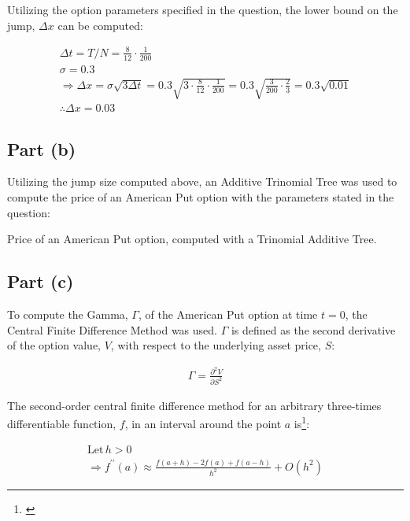 \documentclass[10pt]{article}
\begin{document}
Utilizing the option parameters specified in the question, the lower bound on the jump, $\Delta x$ can be computed:

\begin{gather*}
    \Delta t = T / N = \frac{8}{12} \cdot \frac{1}{200} \\
    \sigma = 0.3 \\
    \Rightarrow \Delta x
        = \sigma \sqrt{3 \Delta t}
        = 0.3 \sqrt{3 \cdot \frac{8}{12} \cdot \frac{1}{200}}
        = 0.3 \sqrt{\frac{3}{200} \cdot \frac{2}{3}}
        = 0.3 \sqrt{0.01} \\
    \therefore \Delta x = 0.03
\end{gather*}


\subsection{Part (b)}

Utilizing the jump size computed above, an Additive Trinomial Tree was used to compute the price of an American Put option with the parameters stated in the question:

\begin{table}[!h]
    \centering
    \caption{Price of an American Put option, computed with a Trinomial Additive Tree.}
    \label{table:q2_american_put_price}
\end{table}

\newpage
\subsection{Part (c)}

To compute the Gamma, $\Gamma$, of the American Put option at time $t = 0$, the Central Finite Difference Method was used. $\Gamma$ is defined as the second derivative of the option value, $V$, with respect to the underlying asset price, $S$:

\begin{gather*}
    \Gamma = \frac{\partial^2 V}{\partial S^2}
\end{gather*}

The second-order central finite difference method for an arbitrary three-times differentiable function, $f$, in an interval around the point $a$ is\footnote{\cite{Stefanica2011}}:

\begin{gather*}
    \text{Let} \, h > 0 \\
    \Rightarrow f^{\prime\prime} (a) \approx \frac{f(a + h) - 2f(a) + f(a - h)}{h^2} + O(h^2)
\end{gather*}
\end{document}
